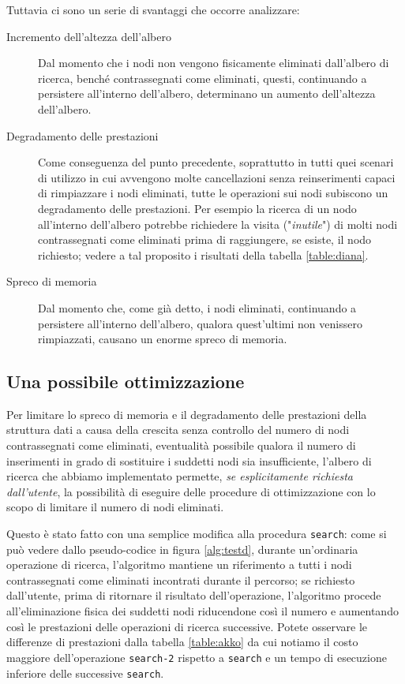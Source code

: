 \documentclass[10pt,a4paper,titlepage]{article}
\begin{document}
Tuttavia ci sono un serie di svantaggi che occorre analizzare:

\begin{description}

\item[Incremento dell'altezza dell'albero] Dal momento che i nodi non vengono fisicamente eliminati dall'albero di ricerca, benché contrassegnati come eliminati, questi, continuando a persistere all'interno dell'albero, determinano un aumento dell'altezza dell'albero.

\item[Degradamento delle prestazioni] Come conseguenza del punto precedente, soprattutto in tutti quei scenari di utilizzo in cui avvengono molte cancellazioni senza reinserimenti capaci di rimpiazzare i nodi eliminati, tutte le operazioni sui nodi subiscono un degradamento delle prestazioni. Per esempio la ricerca di un nodo all'interno dell'albero potrebbe richiedere la visita ("\textit{inutile}") di molti nodi contrassegnati come eliminati prima di raggiungere, se esiste, il nodo richiesto; vedere a tal proposito i risultati della tabella \ref{table:diana}.

\item[Spreco di memoria] Dal momento che, come già detto, i nodi eliminati, continuando a persistere all'interno dell'albero, qualora quest'ultimi non venissero rimpiazzati, causano un enorme spreco di memoria.

\end{description}

\subsection{Una possibile ottimizzazione}

Per limitare lo spreco di memoria e il degradamento delle prestazioni della struttura dati a causa della crescita senza controllo del numero di nodi contrassegnati come eliminati, eventualità possibile qualora il numero di inserimenti in grado di sostituire i suddetti nodi sia insufficiente, l'albero di ricerca che abbiamo implementato permette, \textit{se esplicitamente richiesta dall'utente}, la possibilità di eseguire delle procedure di ottimizzazione con lo scopo di limitare il numero di nodi eliminati.

Questo è stato fatto con una semplice modifica alla procedura \texttt{search}: come si può vedere dallo pseudo-codice in figura \ref{alg:testd}, durante un'ordinaria operazione di ricerca, l'algoritmo mantiene un riferimento a tutti i nodi contrassegnati come eliminati incontrati durante il percorso; se richiesto dall'utente, prima di ritornare il risultato dell'operazione, l'algoritmo procede all'eliminazione fisica dei suddetti nodi riducendone così il numero e aumentando così le prestazioni delle operazioni di ricerca successive. Potete osservare le differenze di prestazioni dalla tabella \ref{table:akko} da cui notiamo il costo maggiore dell'operazione \texttt{search-2} rispetto a \texttt{search} e un tempo di esecuzione inferiore delle successive \texttt{search}.  
 
\end{document}
